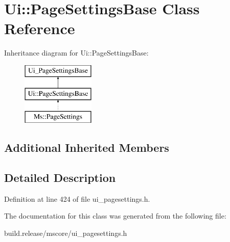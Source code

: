 \hypertarget{class_ui_1_1_page_settings_base}{}\section{Ui\+:\+:Page\+Settings\+Base Class Reference}
\label{class_ui_1_1_page_settings_base}
Inheritance diagram for Ui\+:\+:Page\+Settings\+Base\+:\begin{figure}[H]
\begin{center}
\leavevmode
\includegraphics[height=3.000000cm]{class_ui_1_1_page_settings_base}
\end{center}
\end{figure}
\subsection*{Additional Inherited Members}


\subsection{Detailed Description}


Definition at line 424 of file ui\+\_\+pagesettings.\+h.



The documentation for this class was generated from the following file\+:\begin{DoxyCompactItemize}
\item 
build.\+release/mscore/ui\+\_\+pagesettings.\+h\end{DoxyCompactItemize}
